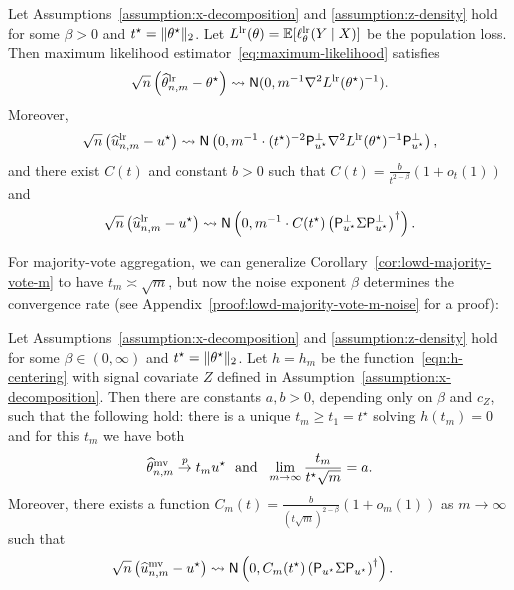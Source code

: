 \begin{proposition}
  \label{prop:lowd-maximum-likelihood}
  Let Assumptions~\ref{assumption:x-decomposition} and
  \ref{assumption:z-density} hold for some $\beta  > 0$ and
  $t^\star = \|{\theta^\star}\|_2$. Let $L^{\textup{lr}}(\theta) = \mathbb{E}[
    \ell_\theta^{\textup{lr}}(Y \mid X)]$ be the population loss.
  Then maximum likelihood estimator~\eqref{eq:maximum-likelihood} satisfies
  \begin{equation*}
    \sqrt{n} \left(\what{\theta}\lr_{n,m} - \theta\opt\right)
    \cd \normal(0, m^{-1}\nabla^2 L\lr(\theta\opt)^{-1})  . %
  \end{equation*}
  Moreover,
  \begin{equation*}
    \sqrt{n}\left(\what{u}\lr_{n,m} - u\opt\right)
    \cd \normal\left(0, m^{-1} \cdot (t\opt)^{-2} \proj_{u\opt}^\perp
    \nabla^2 \poploss\lr(\theta\opt)^{-1} \proj_{u\opt}^\perp\right), %
  \end{equation*}
  and there exist $C(t)$ and constant $b > 0$ such that
  $C(t) = \frac{b}{ t^{2 - \beta}}(1 + o_t(1))$ and 
  \begin{equation*}
    \sqrt{n} \left(\what{u}\lr_{n,m} - u\opt\right)
    \cd \normal\left(0, m^{-1} \cdot C(t\opt) \prn{\proj_{u\opt}^\perp \Sigma \proj_{u\opt}^\perp}^\dagger \right).  %
  \end{equation*}
\end{proposition}

For majority-vote aggregation, we can generalize
Corollary~\ref{cor:lowd-majority-vote-m} to have
$t_m \asymp \sqrt{m}$, but now
the noise exponent $\beta$ determines the convergence rate
(see Appendix~\ref{proof:lowd-majority-vote-m-noise} for a proof):

\begin{proposition} \label{prop:lowd-majority-vote-m-noise}
  Let Assumptions~\ref{assumption:x-decomposition} and
  \ref{assumption:z-density} hold for some $\beta \in (0, \infty)$
  and $t^\star =
  \|{\theta^\star}\|_2$.
  Let $h = h_m$ be the
  function~\eqref{eqn:h-centering} with signal covariate $Z$ defined in
  Assumption~\ref{assumption:x-decomposition}.
  Then there are constants $a, b > 0$, depending only on $\beta$ and $c_Z$,
  such that the following hold: there is a unique $t_m \geq t_1 = t^\star$
  solving $h(t_m) = 0$ and for this $t_m$ we have both
	\begin{equation*}
		\widehat{\theta}^{\textup{mv}}_{n,m} \stackrel{p}{\rightarrow} t_m u^\star
		~~ \mbox{and} ~~
		\lim_{m \to \infty} \frac{t_m}{t^\star \sqrt{m}} = a.
	\end{equation*}
	Moreover,
	there exists a function
	$C_m(t) = \frac{b}{(t \sqrt m)^{2 - \beta}}(1 + o_m(1))$
	as $m \to \infty$ such that
	\begin{align*}
		\sqrt{n} \left(\widehat{u}^{\textup{mv}}_{n,m} - u^\star \right)
		&\rightsquigarrow \mathsf{N}\left(0, C_m(t^\star) \left({\mathsf{P}_{u^\star} \Sigma \mathsf{P}_{u^\star}}\right)^\dagger\right).
	\end{align*}
\end{proposition}

